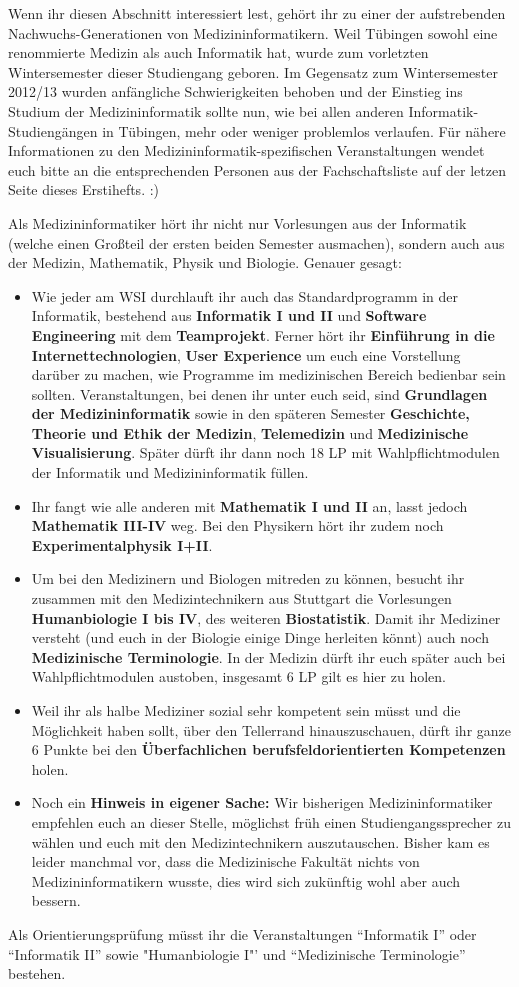 
Wenn ihr diesen Abschnitt interessiert lest, gehört ihr zu einer der aufstrebenden Nachwuchs-Generationen von Medizininformatikern. Weil Tübingen sowohl eine renommierte Medizin als auch Informatik hat, wurde zum vorletzten Wintersemester dieser Studiengang geboren. Im Gegensatz zum Wintersemester 2012/13 wurden anfängliche Schwierigkeiten behoben und der Einstieg ins Studium der Medizininformatik sollte nun, wie bei allen anderen Informatik-Studiengängen in Tübingen, mehr oder weniger problemlos verlaufen.
Für nähere Informationen zu den Medizininformatik-spezifischen Veranstaltungen
wendet euch bitte an die entsprechenden Personen aus der Fachschaftsliste auf
der letzen Seite dieses Erstihefts. :)

Als Medizininformatiker hört ihr nicht nur Vorlesungen aus der Informatik (welche einen Großteil der ersten beiden Semester ausmachen), sondern auch aus der Medizin, Mathematik, Physik und Biologie. Genauer gesagt:
\begin{itemize}
	\item Wie jeder am WSI durchlauft ihr auch das Standardprogramm in der Informatik, bestehend aus \textbf{Informatik I und II} und \textbf{Software Engineering} mit dem \textbf{Teamprojekt}. Ferner hört ihr \textbf{Einführung in die Internettechnologien}, \textbf{User Experience} um euch eine Vorstellung darüber zu machen, wie Programme im medizinischen Bereich bedienbar sein sollten. Veranstaltungen, bei denen ihr unter euch seid, sind \textbf{Grundlagen der Medizininformatik} sowie in den späteren Semester \textbf{Geschichte, Theorie und Ethik der
	Medizin}, \textbf{Telemedizin} und \textbf{Medizinische Visualisierung}. Später dürft ihr dann noch 18 LP mit Wahlpflichtmodulen der Informatik und Medizininformatik füllen.
	\item Ihr fangt wie alle anderen mit \textbf{Mathematik I und II} an, lasst jedoch \textbf{Mathematik III-IV} weg.  Bei den Physikern hört ihr zudem noch \textbf{Experimentalphysik I+II}.
	\item Um bei den Medizinern und Biologen mitreden zu können, besucht ihr zusammen mit den Medizintechnikern aus Stuttgart die Vorlesungen \textbf{Humanbiologie I bis IV}, des weiteren \textbf{Biostatistik}. Damit ihr Mediziner versteht (und euch in der Biologie einige Dinge herleiten könnt) auch noch \textbf{Medizinische Terminologie}. In der Medizin dürft ihr euch später auch bei Wahlpflichtmodulen austoben, insgesamt 6 LP gilt es hier zu holen.
	\item Weil ihr als halbe Mediziner sozial sehr kompetent sein müsst und die Möglichkeit haben sollt, über den Tellerrand hinauszuschauen, dürft ihr ganze 6 Punkte bei den \textbf{Überfachlichen berufsfeldorientierten Kompetenzen} holen.
	\item Noch ein \textbf{Hinweis in eigener Sache:} Wir bisherigen Medizininformatiker empfehlen euch an dieser Stelle, möglichst früh einen Studiengangssprecher zu wählen und euch mit den Medizintechnikern auszutauschen. Bisher kam es leider manchmal vor, dass die Medizinische Fakultät nichts von Medizininformatikern wusste, dies wird sich zukünftig wohl aber auch bessern.
\end{itemize}

Als Orientierungsprüfung müsst ihr die Veranstaltungen "`Informatik I"' oder "`Informatik II"' sowie "Humanbiologie I"' und "`Medizinische Terminologie"' bestehen.

